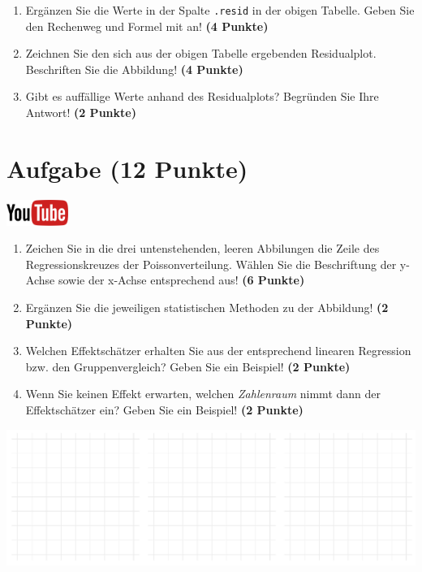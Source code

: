 \documentclass[a4paper, 9pt]{scrartcl}\usepackage[]{graphicx}\usepackage[]{xcolor}
\makeatletter
\def\maxwidth{ %
  \ifdim\Gin@nat@width>\linewidth
    \linewidth
  \else
    \Gin@nat@width
  \fi
}
\makeatother
\begin{document}
\begin{enumerate}
\item Erg{\"a}nzen Sie die Werte in der Spalte \texttt{.resid} in der obigen
  Tabelle. Geben Sie den Rechenweg und Formel mit an! \textbf{(4 Punkte)}
\item Zeichnen Sie den sich aus der obigen Tabelle ergebenden
  Residualplot. Beschriften Sie die Abbildung! \textbf{(4 Punkte)}
\item Gibt es auff{\"a}llige Werte anhand des Residualplots? Begr{\"u}nden Sie Ihre
  Antwort! \textbf{(2 Punkte)}
\end{enumerate}
 
\clearpage

\section{Aufgabe \hfill (12 Punkte)}

\hfill\href{https://youtu.be/lHzRgm7hPw0}{\includegraphics[width =
  2cm]{img/youtube}}\\[1Ex]



\begin{enumerate}
\item Zeichen Sie in die drei untenstehenden, leeren Abbilungen die Zeile des
  Regressionskreuzes der Poissonverteilung. W{\"a}hlen Sie die Beschriftung der
  y-Achse sowie der x-Achse entsprechend aus! \textbf{(6 Punkte)}
\item Erg{\"a}nzen Sie die jeweiligen statistischen Methoden zu der Abbildung! \textbf{(2 Punkte)}
\item Welchen Effektsch{\"a}tzer erhalten Sie aus der entsprechend linearen
  Regression bzw. den Gruppenvergleich? Geben Sie ein Beispiel! \textbf{(2 Punkte)}
\item Wenn Sie keinen Effekt erwarten, welchen \textit{Zahlenraum} nimmt dann
  der Effektsch{\"a}tzer ein? Geben Sie ein Beispiel! \textbf{(2 Punkte)}
\end{enumerate}



{\centering \includegraphics[width=\maxwidth]{img/regression-01-1} 

}
\end{document}
